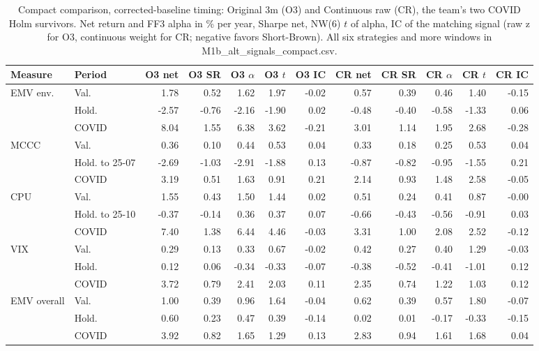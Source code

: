 \begin{table}[htbp]
\centering
\footnotesize
\caption{Compact comparison, corrected-baseline timing: Original 3m (O3) and Continuous raw (CR), the team's two COVID Holm survivors. Net return and FF3 alpha in \% per year, Sharpe net, NW(6) $t$ of alpha, IC of the matching signal (raw z for O3, continuous weight for CR; negative favors Short-Brown). All six strategies and more windows in M1b\_alt\_signals\_compact.csv.}
\label{tab:m1b_compact}
\begin{tabular}{llrrrrrrrrrr}
\toprule
Measure & Period & O3 net & O3 SR & O3 $\alpha$ & O3 $t$ & O3 IC & CR net & CR SR & CR $\alpha$ & CR $t$ & CR IC \\
\midrule
EMV env. & Val. & 1.78 & 0.52 & 1.62 & 1.97 & -0.02 & 0.57 & 0.39 & 0.46 & 1.40 & -0.15 \\
 & Hold. & -2.57 & -0.76 & -2.16 & -1.90 & 0.02 & -0.48 & -0.40 & -0.58 & -1.33 & 0.06 \\
 & COVID & 8.04 & 1.55 & 6.38 & 3.62 & -0.21 & 3.01 & 1.14 & 1.95 & 2.68 & -0.28 \\
MCCC & Val. & 0.36 & 0.10 & 0.44 & 0.53 & 0.04 & 0.33 & 0.18 & 0.25 & 0.53 & 0.04 \\
 & Hold. to 25-07 & -2.69 & -1.03 & -2.91 & -1.88 & 0.13 & -0.87 & -0.82 & -0.95 & -1.55 & 0.21 \\
 & COVID & 3.19 & 0.51 & 1.63 & 0.91 & 0.21 & 2.14 & 0.93 & 1.48 & 2.58 & -0.05 \\
CPU & Val. & 1.55 & 0.43 & 1.50 & 1.44 & 0.02 & 0.51 & 0.24 & 0.41 & 0.87 & -0.00 \\
 & Hold. to 25-10 & -0.37 & -0.14 & 0.36 & 0.37 & 0.07 & -0.66 & -0.43 & -0.56 & -0.91 & 0.03 \\
 & COVID & 7.40 & 1.38 & 6.44 & 4.46 & -0.03 & 3.31 & 1.00 & 2.08 & 2.52 & -0.12 \\
VIX & Val. & 0.29 & 0.13 & 0.33 & 0.67 & -0.02 & 0.42 & 0.27 & 0.40 & 1.29 & -0.03 \\
 & Hold. & 0.12 & 0.06 & -0.34 & -0.33 & -0.07 & -0.38 & -0.52 & -0.41 & -1.01 & 0.12 \\
 & COVID & 3.72 & 0.79 & 2.41 & 2.03 & 0.11 & 2.35 & 0.74 & 1.22 & 1.03 & 0.12 \\
EMV overall & Val. & 1.00 & 0.39 & 0.96 & 1.64 & -0.04 & 0.62 & 0.39 & 0.57 & 1.80 & -0.07 \\
 & Hold. & 0.60 & 0.23 & 0.47 & 0.39 & -0.14 & 0.02 & 0.01 & -0.17 & -0.33 & -0.15 \\
 & COVID & 3.92 & 0.82 & 1.65 & 1.29 & 0.13 & 2.83 & 0.94 & 1.61 & 1.68 & 0.04 \\

\end{tabular}
\end{table}
